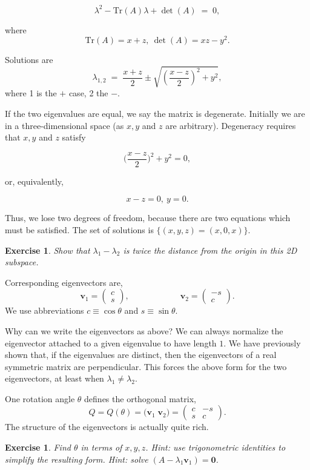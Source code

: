 \documentclass[12pt,letterpaper]{report}
\newcommand\be{\begin{equation}}
\newcommand\ee{\end{equation}}
\newtheorem{exe}[thm]{Exercise}
\newcommand{\mat}[4]{\ensuremath{\left(\begin{array}{ll}#1 &#2 \\ #3 &#4%
\end{array}\right)}}
\newcommand{\mbf}[1]{{\mathbf #1}}
\begin{document}
\be \lambda^2 - \text{Tr}(A) \lambda + \det(A) \; = \; 0, \ee

where \be \text{Tr}(A) = x + z, \ \det(A) = xz - y^2. \ee

Solutions are \be \lambda_{1,2} \; = \; \frac{x+z}{2} \pm
\sqrt{\left(\frac{x-z}{2}\right)^2 + y^2}, \ee where 1 is the $+$
case, 2 the $-$.

If the two eigenvalues are equal, we say the matrix is degenerate.
Initially we are in a three-dimensional space (as $x, y$ and $z$
are arbitrary). Degeneracy requires that $x, y$ and $z$ satisfy

\be \Big(\frac{x-z}{2}\Big)^2 + y^2 = 0, \ee

or, equivalently,

\be x - z = 0, \ y = 0. \ee

Thus, we lose two degrees of freedom, because there are two
equations which must be satisfied. The set of solutions is
$\{(x,y,z) = (x,0,x) \}$.

\begin{exe} Show that $\lambda_1 - \lambda_2$ is twice the
distance from the origin in this 2D subspace. \end{exe}

Corresponding eigenvectors are, \be \mbf{v}_1 =
\left(\begin{array}{l}c\\ s\end{array}\right), \hspace{1in}
\mbf{v}_2 = \left(\begin{array}{l}-s\\ c\end{array}\right). \ee We
use abbreviations $c \equiv \cos \theta$ and $s \equiv \sin
\theta$.

Why can we write the eigenvectors as above? We can always
normalize the eigenvector attached to a given eigenvalue to have
length $1$. We have previously shown that, if the eigenvalues are
distinct, then the eigenvectors of a real symmetric matrix are
perpendicular. This forces the above form for the two
eigenvectors, at least when $\lambda_1 \neq \lambda_2$.

One rotation angle $\theta$ defines the orthogonal matrix, \be Q =
Q(\theta) = \biggl(\mbf{v}_1 \; \mbf{v}_2\biggr)  =
\mat{c}{-s}{s}{c}. \ee The structure of the eigenvectors is
actually quite rich.

\begin{exe}
Find $\theta$ in terms of $x,y,z$. Hint: use trigonometric
identities to simplify the resulting form. Hint: solve $(A-
\lambda_1 \mbf{v}_1) = \mbf{0}$.
\end{exe}
\end{document}
